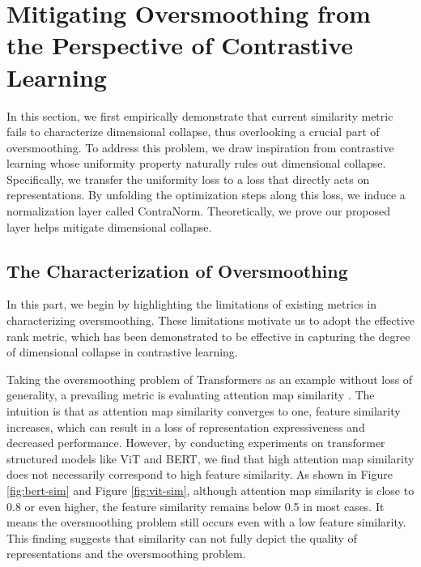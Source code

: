 \documentclass{article}
\theoremstyle{definition}
\theoremstyle{remark}
\theoremstyle{theorem}
\begin{document}
\section{Mitigating Oversmoothing from the Perspective of Contrastive Learning}

In this section, we first empirically demonstrate that current similarity metric fails to characterize dimensional collapse, thus overlooking a crucial part of oversmoothing. To address this problem, we draw inspiration from contrastive learning whose uniformity property naturally rules out dimensional collapse. Specifically, we transfer the uniformity loss to a loss that directly acts on representations. By unfolding the optimization steps along this loss, we induce a normalization layer called ContraNorm. Theoretically, we prove our proposed layer helps mitigate dimensional collapse.


\subsection{The Characterization of Oversmoothing}

In this part, we begin by highlighting the limitations of existing metrics in characterizing oversmoothing. These limitations motivate us to adopt the effective rank metric, which has been demonstrated to be effective in capturing the degree of dimensional collapse in contrastive learning. 

Taking the oversmoothing problem of Transformers as an example without loss of generality, a prevailing metric is evaluating attention map similarity \citep{wang2022anti, gong2021vision, shi2022revisiting}. The intuition is that as attention map similarity converges to one, feature similarity increases, which can result in a loss of representation expressiveness and decreased performance. However, by conducting experiments on transformer structured models like ViT and BERT, we find that high attention map similarity does not necessarily correspond to high feature similarity. As shown in Figure \ref{fig:bert-sim} and Figure \ref{fig:vit-sim}, although attention map similarity is close to 0.8 or even higher, the feature similarity remains below 0.5 in most cases. It means the oversmoothing problem still occurs even with a low feature similarity. This finding suggests that similarity can not fully depict the quality of representations and the oversmoothing problem. 
\end{document}
